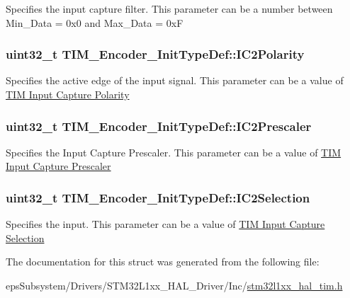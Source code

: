 Specifies the input capture filter. This parameter can be a number between Min\-\_\-\-Data = 0x0 and Max\-\_\-\-Data = 0x\-F \hypertarget{struct_t_i_m___encoder___init_type_def_abb7968a8ba34e13da1fb8f5916a754ce}{
\subsubsection[{I\-C2\-Polarity}]{\setlength{\rightskip}{0pt plus 5cm}uint32\-\_\-t T\-I\-M\-\_\-\-Encoder\-\_\-\-Init\-Type\-Def\-::\-I\-C2\-Polarity}}\label{struct_t_i_m___encoder___init_type_def_abb7968a8ba34e13da1fb8f5916a754ce}
Specifies the active edge of the input signal. This parameter can be a value of \hyperlink{group___t_i_m___input___capture___polarity}{T\-I\-M Input Capture Polarity} \hypertarget{struct_t_i_m___encoder___init_type_def_ac80972d0e157508ff075815da58070cb}{
\subsubsection[{I\-C2\-Prescaler}]{\setlength{\rightskip}{0pt plus 5cm}uint32\-\_\-t T\-I\-M\-\_\-\-Encoder\-\_\-\-Init\-Type\-Def\-::\-I\-C2\-Prescaler}}\label{struct_t_i_m___encoder___init_type_def_ac80972d0e157508ff075815da58070cb}
Specifies the Input Capture Prescaler. This parameter can be a value of \hyperlink{group___t_i_m___input___capture___prescaler}{T\-I\-M Input Capture Prescaler} \hypertarget{struct_t_i_m___encoder___init_type_def_a84a39a8667f296b4b3fbe1a0add58396}{
\subsubsection[{I\-C2\-Selection}]{\setlength{\rightskip}{0pt plus 5cm}uint32\-\_\-t T\-I\-M\-\_\-\-Encoder\-\_\-\-Init\-Type\-Def\-::\-I\-C2\-Selection}}\label{struct_t_i_m___encoder___init_type_def_a84a39a8667f296b4b3fbe1a0add58396}
Specifies the input. This parameter can be a value of \hyperlink{group___t_i_m___input___capture___selection}{T\-I\-M Input Capture Selection} 

The documentation for this struct was generated from the following file\-:\begin{DoxyCompactItemize}
\item 
eps\-Subsystem/\-Drivers/\-S\-T\-M32\-L1xx\-\_\-\-H\-A\-L\-\_\-\-Driver/\-Inc/\hyperlink{stm32l1xx__hal__tim_8h}{stm32l1xx\-\_\-hal\-\_\-tim.\-h}\end{DoxyCompactItemize}
